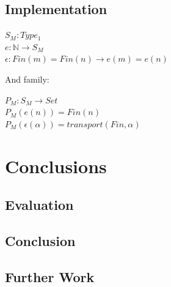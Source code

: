 \documentclass[12pt]{report}
\begin{document}
\chapter{Implementation}
\begin{center}
$S_M : Type_1$\\
$e : \mathbb{N} \to S_M$\\
$\epsilon : Fin(m) = Fin(n) \to e(m) = e(n) $\\
\end{center}
And family:
\begin{center}
$P_M : S_M \to Set$\\
$P_M(e(n)) = Fin(n)$\\
$P_M(\epsilon(\alpha)) = transport(Fin, \alpha)$\\

\end{center}

\part{Conclusions}

\chapter{Evaluation}

\chapter{Conclusion}

\chapter{Further Work}

\cleardoublepage
{}
{}
\end{document}
